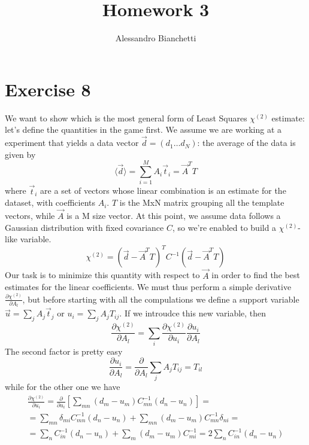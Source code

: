 \documentclass[a4paper,11pt,fleqn]{article}
\title{Homework 3}
\author{Alessandro Bianchetti}
\begin{document}
\maketitle

\section{Exercise 8}
We want to show which is the most general form of Least Squares $\chi^{(2)}$
estimate: let's define the quantities in the game first. We assume we are 
working at a experiment that yields a data vector $\vec{d}=(d_1 \dotsc d_N)$: 
the average of the data is given by 
\begin{equation}
    \langle \vec{d} \rangle = \sum_{i=1}^M A_i \vec{t}_i = \vec{A}^TT    
\end{equation}
where $\vec{t}_i$ are a set of vectors whose linear combination is an 
estimate for the dataset, with coefficients $A_i$. $T$ is the MxN matrix 
grouping all the template vectors, while $\vec{A}$ is a M size vector. 
At this point, we assume data follows a Gaussian distribution with fixed 
covariance $C$, so we're enabled to build a $\chi^{(2)}$-like variable.
\begin{equation}
    \chi^{(2)}=(\vec{d}-\vec{A}^TT)^T C^{-1}(\vec{d}-\vec{A}^TT)
\end{equation} 
Our task is to minimize this quantity with respect to $\vec{A}$ in order to 
find the best estimates for the linear coefficients. We must thus perform 
a simple derivative $\frac{\partial \chi^{(2)}}{\partial A_l}$, but before 
starting with all the compulations we define a support variable 
$\vec{u} = \sum_jA_j\vec{t}_j$ or $u_i = \sum_j A_j T_{ij}$. If we 
introudce this new variable, then 
\begin{equation}
    \label{eqn:der}
    \frac{\partial \chi^{(2)}}{\partial A_l} = \sum_i \frac{\partial \chi^{(2)}}{\partial u_i}\frac{\partial u_i}{\partial A_l}
\end{equation}
The second factor is pretty easy
\begin{equation*}
    \frac{\partial u_i}{\partial A_l} = \frac{\partial }{\partial A_l} \sum_j A_j T_{ij} = T_{il} 
\end{equation*}
while for the other one we have 
\begin{gather*}
    \frac{\partial \chi^{(2)}}{\partial u_i} = \frac{\partial}{\partial u_i}\left[\sum_{mn}(d_m-u_m)C^{-1}_{mn}(d_n-u_n)\right] = \\ 
    = \sum_{mn}\delta_{mi}C^{-1}_{mn}(d_n-u_n) + \sum_{mn}(d_m-u_m)C^{-1}_{mn}\delta_{ni} = \\ 
    = \sum_{n}C^{-1}_{in}(d_n-u_n) + \sum_{m}(d_m-u_m)C^{-1}_{mi} = 2\sum_n C^{-1}_{in}(d_n-u_n) 
\end{gather*}
\end{document}
